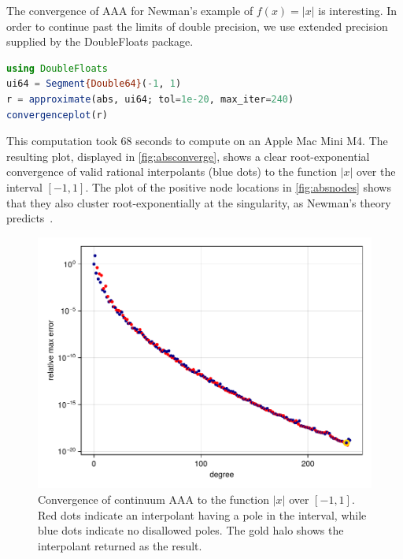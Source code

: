 \documentclass{juliacon}
\begin{document}
The convergence of AAA for Newman's example of $f(x)=|x|$ is interesting. In order to continue past the limits of double precision, we use extended precision supplied by the \textsf{DoubleFloats} package.
\begin{lstlisting}[language = Julia, caption={Continuum AAA for $|x|$.}, label={lst:abs}]
using DoubleFloats
ui64 = Segment{Double64}(-1, 1)
r = approximate(abs, ui64; tol=1e-20, max_iter=240)
convergenceplot(r)
\end{lstlisting}
This computation took 68 seconds to compute on an Apple Mac Mini M4. The resulting plot, displayed in \autoref{fig:absconverge}, shows a clear root-exponential convergence of valid rational interpolants (blue dots) to the function $|x|$ over the interval $[-1,1]$. The plot of the positive node locations in \autoref{fig:absnodes} shows that they also cluster root-exponentially at the singularity, as Newman's theory predicts~\cite{newmanRationalApproximation1964}. 

\begin{figure}
\centering
\includegraphics[width=\columnwidth]{absconverge.pdf}
\caption{Convergence of continuum AAA to the function $|x|$ over $[-1,1]$. Red dots indicate an interpolant having a pole in the interval, while blue dots indicate no disallowed poles. The gold halo shows the interpolant returned as the result.}
\label{fig:absconverge}
\end{figure}
\end{document}
